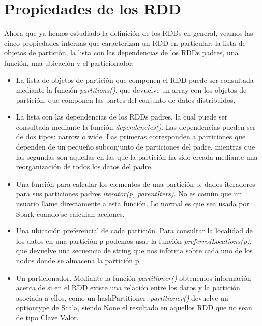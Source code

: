\section{Propiedades de los RDD}
Ahora que ya hemos estudiado la definición de los RDDs en general, veamos las cinco propiedades internas que caracterizan un RDD en particular: la lista de objetos de partición, la lista con las dependencias de los RDDs padres, una función, una ubicación y el particionador:

\begin{itemize}
\item La lista de objetos de partición que componen el RDD puede ser consultada mediante la función \textit{partitions()}, que devuelve un array con los objetos de partición, que componen las partes del conjunto de datos distribuidos.
 
\item La lista con las dependencias de los RDDs padres, la cual puede ser consultada mediante la función \textit{dependencies()}. Las dependencias pueden ser de dos tipos: narrow o wide. Las primeras corresponden a particiones que dependen de un pequeño subconjunto de particiones del padre, mientras que las segundas son aquellas en las que la partición ha sido creada mediante una reorganización de todos los datos del padre.
 
\item Una función para calcular los elementos de una partición p, dados iteradores para sus particiones padres \textit{iterator(p, parentIters)}. No es común que un usuario llame directamente a esta función. Lo normal es que sea usada por Spark cuando se calculan acciones.
 
\item Una ubicación preferencial de cada partición. Para consultar la localidad de los datos en una partición p podemos usar la función \textit{preferredLocations(p)}, que devuelve una secuencia de string que nos informa sobre cada uno de los nodos donde se almacena la partición p.
 
\item Un particionador. Mediante la función \textit{partitioner()} obtenemos información acerca de si en el  RDD existe una relación entre los datos y la partición asociada a ellos, como un hashPartitioner. \textit{partitioner()} devuelve un optiontype de Scala, siendo None el resultado en aquellos RDD que no sean de tipo Clave Valor.

\end{itemize}

